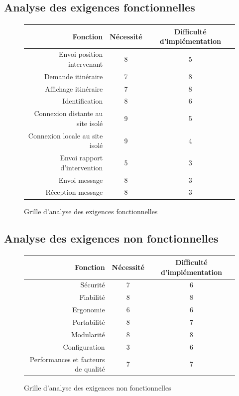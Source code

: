 \documentclass[a4paper, 11pt, final]{article}
\begin{document}
\subsection{Analyse des exigences fonctionnelles}

\paragraph{}
\begin{figure}[h!]
\begin{center}
\begin{tabular}{|r|c|c|}
\hline
Fonction & Nécessité & Difficulté d'implémentation\\ \hline \hline
Envoi position intervenant & 8 & 5\\ \hline
Demande itinéraire & 7 & 8\\ \hline
Affichage itinéraire & 7 & 8\\ \hline
Identification & 8 & 6\\ \hline
Connexion distante au site isolé & 9 & 5\\ \hline
Connexion locale au site isolé & 9 & 4\\ \hline
Envoi rapport d'intervention & 5 & 3\\ \hline
Envoi message & 8 & 3\\ \hline
Réception message & 8 & 3\\ \hline
\end{tabular}
\end{center}
\caption{Grille d'analyse des exigences fonctionnelles}
\end{figure}
\FloatBarrier


\subsection{Analyse des exigences non fonctionnelles}

\paragraph{}
\begin{figure}[h!]
\begin{center}
\begin{tabular}{|r|c|c|}
\hline
Fonction & Nécessité & Difficulté d'implémentation\\ \hline \hline
Sécurité & 7 & 6\\ \hline
Fiabilité & 8 & 8\\ \hline
Ergonomie & 6 & 6\\ \hline
Portabilité & 8 & 7\\ \hline
Modularité & 8 & 8\\ \hline
Configuration & 3 & 6\\ \hline
Performances et facteurs de qualité & 7 & 7\\ \hline
\end{tabular}
\end{center}
\caption{Grille d'analyse des exigences non fonctionnelles}
\end{figure}
\FloatBarrier
\end{document}
